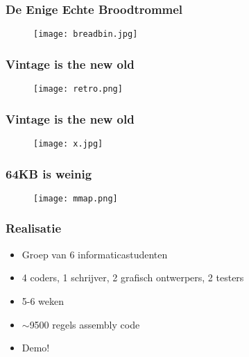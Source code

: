 \documentclass[aspectratio=169]{beamer}
\begin{document}
\begin{frame}
\frametitle{De Enige Echte Broodtrommel}

\begin{figure}
\texttt{[image: breadbin.jpg]}
\end{figure}

\end{frame}

\begin{frame}
\frametitle{Vintage is the new old}

\begin{figure}
\texttt{[image: retro.png]}
\end{figure}

\end{frame}

\begin{frame}
\frametitle{Vintage is the new old}

\begin{figure}
\texttt{[image: x.jpg]}
\end{figure}

\end{frame}

\begin{frame}
\frametitle{64KB is weinig}

\begin{figure}
\texttt{[image: mmap.png]}
\end{figure}

\end{frame}

\begin{frame}
\frametitle{Realisatie}

\begin{itemize}
\item Groep van 6 informaticastudenten
\item 4 coders, 1 schrijver, 2 grafisch ontwerpers, 2 testers
\item 5-6 weken
\item $\sim$9500 regels assembly code
\item Demo!
\end{itemize}

\end{frame}
\end{document}
